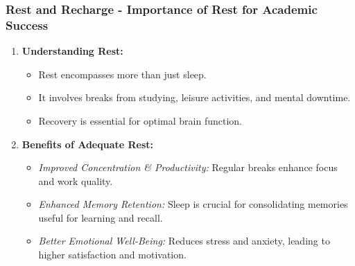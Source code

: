 \documentclass[aspectratio=169]{beamer}
\begin{document}
\begin{frame}[fragile]
    \frametitle{Rest and Recharge - Importance of Rest for Academic Success}
    \begin{enumerate}
        \item \textbf{Understanding Rest:}
        \begin{itemize}
            \item Rest encompasses more than just sleep.
            \item It involves breaks from studying, leisure activities, and mental downtime.
            \item Recovery is essential for optimal brain function.
        \end{itemize}
        
        \item \textbf{Benefits of Adequate Rest:}
        \begin{itemize}
            \item \textit{Improved Concentration \& Productivity:} Regular breaks enhance focus and work quality.
            \item \textit{Enhanced Memory Retention:} Sleep is crucial for consolidating memories useful for learning and recall.
            \item \textit{Better Emotional Well-Being:} Reduces stress and anxiety, leading to higher satisfaction and motivation.
        \end{itemize}
    \end{enumerate}
\end{frame}
\end{document}
